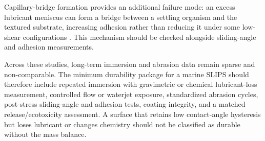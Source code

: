 Capillary-bridge formation provides an additional failure mode: an excess lubricant meniscus can form a bridge between a settling organism and the textured substrate, increasing adhesion rather than reducing it under some low-shear configurations \cite{arxiv201208619}. This mechanism should be checked alongside sliding-angle and adhesion measurements.

Across these studies, long-term immersion and abrasion data remain sparse and non-comparable. The minimum durability package for a marine SLIPS should therefore include repeated immersion with gravimetric or chemical lubricant-loss measurement, controlled flow or waterjet exposure, standardized abrasion cycles, post-stress sliding-angle and adhesion tests, coating integrity, and a matched release/ecotoxicity assessment. A surface that retains low contact-angle hysteresis but loses lubricant or changes chemistry should not be classified as durable without the mass balance.
